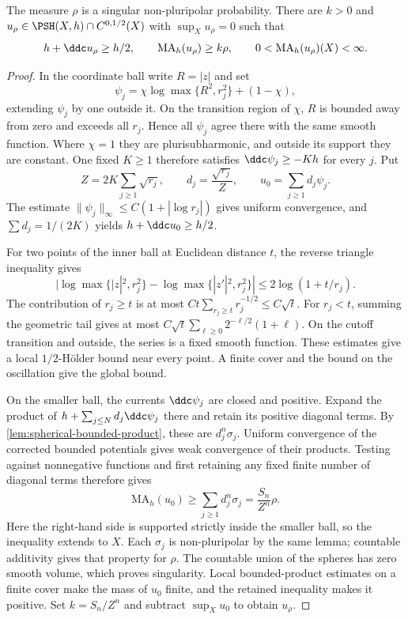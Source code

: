 \begin{proposition}\label{prop:fixed-spherical-reference}
The measure $\rho$ is a singular non-pluripolar probability. There are $k>0$ and $u_\rho\in\PSH(X,h)\cap C^{0,1/2}(X)$ with $\sup_Xu_\rho=0$ such that
\[
 h+\ddc u_\rho\geq h/2,\qquad
 \mathrm{MA}_h(u_\rho)\geq k\rho,\qquad
 0<\mathrm{MA}_h(u_\rho)(X)<\infty.
\]
\end{proposition}
\begin{proof}
In the coordinate ball write $R=|z|$ and set
\[
 \psi_j=\chi\log\max\{R^2,r_j^2\}+(1-\chi),
\]
extending $\psi_j$ by one outside it. On the transition region of $\chi$, $R$ is bounded away from zero and exceeds all $r_j$. Hence all $\psi_j$ agree there with the same smooth function. Where $\chi=1$ they are plurisubharmonic, and outside its support they are constant. One fixed $K\geq1$ therefore satisfies $\ddc\psi_j\geq-Kh$ for every $j$. Put
\[
 Z=2K\sum_{j\geq1}\sqrt{r_j},\qquad
 d_j=\frac{\sqrt{r_j}}Z,\qquad u_0=\sum_{j\geq1}d_j\psi_j.
\]
The estimate $\|\psi_j\|_\infty\leq C(1+|\log r_j|)$ gives uniform convergence, and $\sum d_j=1/(2K)$ yields $h+\ddc u_0\geq h/2$.

For two points of the inner ball at Euclidean distance $t$, the reverse triangle inequality gives
\[
 |\log\max\{|z|^2,r_j^2\}-\log\max\{|z'|^2,r_j^2\}|
 \leq2\log(1+t/r_j).
\]
The contribution of $r_j\geq t$ is at most $Ct\sum_{r_j\geq t}r_j^{-1/2}\leq C\sqrt t$. For $r_j<t$, summing the geometric tail gives at most $C\sqrt t\sum_{\ell\geq0}2^{-\ell/2}(1+\ell)$. On the cutoff transition and outside, the series is a fixed smooth function. These estimates give a local $1/2$-H\"older bound near every point. A finite cover and the bound on the oscillation give the global bound.

On the smaller ball, the currents $\ddc\psi_j$ are closed and positive. Expand the product of $h+\sum_{j\leq N}d_j\ddc\psi_j$ there and retain its positive diagonal terms. By \cref{lem:spherical-bounded-product}, these are $d_j^n\sigma_j$. Uniform convergence of the corrected bounded potentials gives weak convergence of their products. Testing against nonnegative functions and first retaining any fixed finite number of diagonal terms therefore gives
\[
 \mathrm{MA}_h(u_0)\geq\sum_{j\geq1}d_j^n\sigma_j
                       =\frac{S_n}{Z^n}\rho.
\]
Here the right-hand side is supported strictly inside the smaller ball, so the inequality extends to $X$. Each $\sigma_j$ is non-pluripolar by the same lemma; countable additivity gives that property for $\rho$. The countable union of the spheres has zero smooth volume, which proves singularity. Local bounded-product estimates on a finite cover make the mass of $u_0$ finite, and the retained inequality makes it positive. Set $k=S_n/Z^n$ and subtract $\sup_Xu_0$ to obtain $u_\rho$.
\end{proof}

